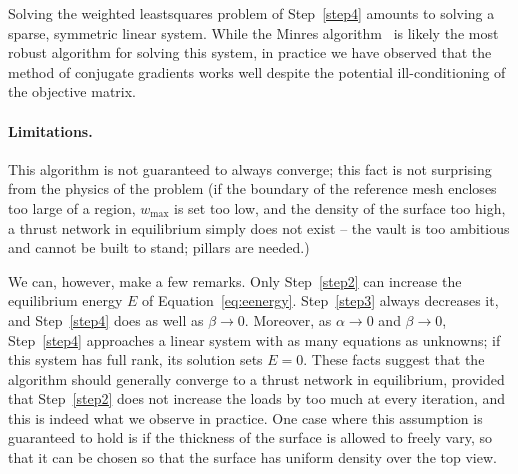 \documentclass[annual]{acmsiggraph}
\begin{document}
Solving the weighted least\dash squares problem of Step~\ref{step4}
amounts to solving a sparse, symmetric linear system. While the {\sc Minres}
algorithm~\cite{paige75} is likely the most robust algorithm for solving
this system, in practice we have observed that the method of conjugate
gradients works well despite the potential ill-conditioning of the
objective matrix.





\paragraph{Limitations.}

This algorithm is not guaranteed to always converge; this fact is not
surprising from the physics of the problem (if the boundary of the
reference mesh encloses too large of a region, $w_{\max}$ is set too low,
and the density of the surface too high, a thrust network in equilibrium
simply does not exist -- the vault is too ambitious and cannot be built to
stand; pillars are needed.)

We can, however, make a few remarks. Only Step~\ref{step2} can 
increase the equilibrium
 energy $E$ of Equation~\eqref{eq:eenergy}.
Step~\ref{step3} always decreases it, and Step~\ref{step4} does as well as $\beta \to 0$. Moreover, as $\alpha
\to 0$ and $\beta \to 0$, Step~\ref{step4} approaches a linear system with
as many equations as unknowns; if this system has full rank, its solution
sets $E=0$. These facts suggest that the algorithm should generally
converge to a thrust network in equilibrium, provided that
Step~\ref{step2} does not increase the loads by too much at every
iteration, and this is indeed what we observe in practice. One case where
this assumption is guaranteed to hold is if the thickness of the surface
is allowed to freely vary, so that it can be chosen so that the surface
has uniform density over the top view.
\end{document}
